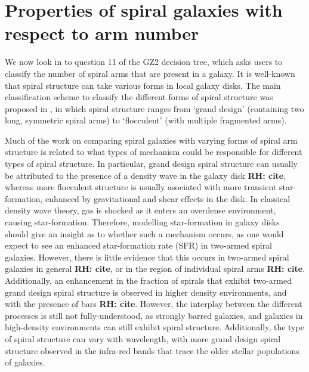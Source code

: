 \documentclass[useAMS,usenatbib]{mn2e}
\newcommand{\rh}[1]{{\bf \textcolor{RoyalPurple}{RH: #1}}}
\begin{document}
\section{Properties of spiral galaxies with respect to arm number}
\label{sec:results}

We now look in to question 11 of the GZ2 decision tree, which asks users to classify the number of spiral arms that are present in a galaxy. It is well-known that spiral structure can take various forms in local galaxy disks. The main classification scheme to classify the different forms of spiral structure was proposed in \citep{EE_82}, in which spiral structure ranges from `grand design' (containing two long, symmetric spiral arms) to `flocculent' (with multiple fragmented arms). 

Much of the work on comparing spiral galaxies with varying forms of spiral arm structure is related to what types of mechanism could be responsible for different types of spiral structure. In particular, grand design spiral structure can usually be attributed to the presence of a density wave in the galaxy disk \rh{cite}, whereas more flocculent structure is usually asociated with more transient star-formation, enhanced by gravitational and shear effects in the disk. In classical density wave theory, gas is shocked as it enters an overdense environment, causing star-formation. Therefore, modelling star-formation in galaxy disks should give an insight as to whether such a mechanism occurs, as one would expect to see an enhanced star-formation rate (SFR) in two-armed spiral galaxies. However, there is little evidence that this occurs in two-armed spiral galaxies in general \rh{cite}, or in the region of individual spiral arms \rh{cite}. Additionally, an enhancement in the fraction of spirals that exhibit two-armed grand design spiral structure is observed in higher density environments, and with the presence of bars \rh{cite}. However, the interplay between the different processes is still not fully-understood, as strongly barred galaxies, and galaxies in high-density environments can still exhibit spiral structure. Additionally, the type of spiral structure can vary with wavelength, with more grand design spiral structure observed in the infra-red bands that trace the older stellar populations of galaxies. 
\end{document}
